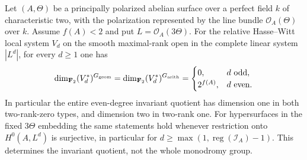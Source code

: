 \begin{theorem}
\label{thm:nonordinary-ppav-all-covectors}
Let $(A,\Theta)$ be a principally polarized abelian surface over a
perfect field $k$ of characteristic two, with the polarization
represented by the line bundle $\mathcal O_A(\Theta)$ over $k$.
Assume $f(A)<2$ and put $L=\mathcal O_A(3\Theta)$.
For the relative Hasse--Witt local system $V_d$ on the smooth
maximal-rank open in the complete linear system $|L^d|$, for every
$d\geq1$ one has
\begin{equation}\label{eq:nonordinary-ppav-entire-covectors}
 \dim_{\mathbf F_2}(V_d^*)^{G_{\rm geom}}
 =\dim_{\mathbf F_2}(V_d^*)^{G_{\rm arith}}
 =\begin{cases}0,&d\text{ odd},\\2^{f(A)},&d\text{ even}.
 \end{cases}
\end{equation}
In particular the entire even-degree invariant quotient has dimension
one in both two-rank-zero types, and dimension two in two-rank one.
For hypersurfaces in the fixed $3\Theta$ embedding the same statements
hold whenever restriction onto $H^0(A,L^d)$ is surjective, in particular
for $d\geq\max(1,\operatorname{reg}(\mathcal I_A)-1)$.
This determines the invariant quotient, not the whole monodromy group.
\end{theorem}
